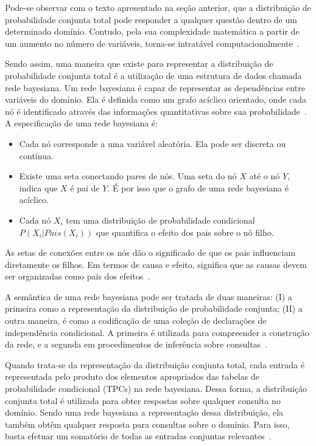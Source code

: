 Pode-se observar com o texto apresentado na seção anterior, que a distribuição de probabilidade conjunta total pode responder a qualquer questão dentro de um determinado domínio. Contudo, pela sua complexidade matemática a partir de um aumento no número de variáveis, torna-se intratável computacionalmente~\cite{Russell:2002}.

Sendo assim, uma maneira que existe para representar a distribuição de probabilidade conjunta total é a utilização de uma estrutura de dados chamada rede bayesiana. Um rede bayesiana é capaz de representar as dependências entre variáveis do domínio. Ela é definida como um grafo acíclico orientado, onde cada nó é identificado através das informações quantitativas sobre sua probabilidade~\cite{Russell:2002}. A especificação de uma rede bayesiana é:

\begin{itemize}
    \item Cada nó corresponde a uma variável aleatória. Ela pode ser discreta ou contínua.
    \item Existe uma seta conectando pares de nós. Uma seta do nó $X$ até o nó $Y$, indica que $X$ é pai de $Y$. É por isso que o grafo de uma rede bayesiana é acíclico.
    \item Cada nó $X_i$ tem uma distribuição de probabilidade condicional $P(X_i|Pais(X_i))$ que quantifica o efeito dos pais sobre o nó filho.
\end{itemize}

As setas de conexões entre os nós dão o significado de que os pais influenciam diretamente os filhos. Em termos de causa e efeito, significa que as causas devem ser organizadas como pais dos efeitos~\cite{Russell:2002}.

A semântica de uma rede bayesiana pode ser tratada de duas maneiras: (I) a primeira como a representação da distribuição de probabilidade conjunta; (II) a outra maneira, é como a codificação de uma coleção de declarações de independência condicional. A primeira é utilizada para compreender a construção da rede, e a segunda em procedimentos de inferência sobre consultas~\cite{Russell:2002}.

Quando trata-se da representação da distribuição conjunta total, cada entrada é representada pelo produto dos elementos apropriados das tabelas de probabilidade condicional (TPCs) na rede bayesiana. Dessa forma, a distribuição conjunta total é utilizada para obter respostas sobre qualquer consulta no domínio. Sendo uma rede bayesiana a representação dessa distribuição, ela também obtêm qualquer resposta para consultas sobre o domínio. Para isso, basta efetuar um somatório de todas as entradas conjuntas relevantes~\cite{Russell:2002}.

